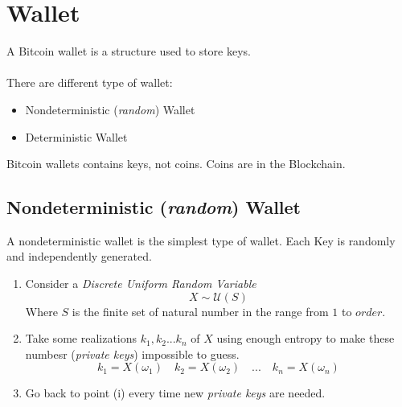 
\chapter{Wallet} %

\label{bip32} %





A Bitcoin wallet is a structure used to store keys. \\ \\
There are different type of wallet:
\begin{itemize}
	\item Nondeterministic (\textit{random}) Wallet
	\item Deterministic Wallet
\end{itemize}

\begin{remark}
	Bitcoin wallets contains keys, not coins. Coins are in the Blockchain.
\end{remark}

\section{Nondeterministic (\textit{random}) Wallet}
A nondeterministic wallet is the simplest type of wallet. Each Key is randomly and independently generated.

\begin{enumerate}[label=(\roman*)]
	\item Consider a \textit{Discrete Uniform Random Variable}
	\begin{equation*}
		X\sim \mathcal{U}(S)
	\end{equation*}
	Where $S$ is the finite set of natural number in the range from $1$ to $order$.
	\item Take some realizations $k_1,k_2...k_n$ of $X$ using enough entropy to make these numbesr (\textit{private keys}) impossible to guess.
	\begin{equation*}
		k_1=X(\omega_1) \quad  k_2=X(\omega_2) \quad ... \quad k_n=X(\omega_n)
	\end{equation*}
	\item Go back to point (i) every time new \textit{private keys} are needed.
\end{enumerate}

